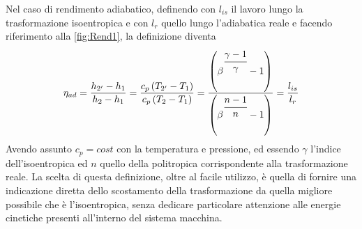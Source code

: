 Nel caso di rendimento adiabatico, definendo con $l_{is}$ il lavoro lungo la trasformazione isoentropica e con $l_r$ quello lungo l'adiabatica reale e facendo riferimento alla \ref{fig:Rend1}, la definizione diventa
\begin{align*}
\eta_{ad} = \frac{h_{2'} - h_1}{h_2 - h_1} = \frac{c_p \left( T_{2'} - T_1 \right)}{c_p \left( T_2 - T_1 \right)} = \frac{\left( \beta^{\cfrac{\gamma -1}{\gamma}} -1 \right)}{\left( \beta^{\cfrac{n -1}{n}} -1 \right)} = \frac{l_{is}}{l_r}
\end{align*}
Avendo assunto $c_p = cost$ con la temperatura e pressione, ed essendo $\gamma$ l'indice dell'isoentropica ed $n$ quello della politropica corrispondente alla trasformazione reale. La scelta di questa definizione, oltre al facile utilizzo, è quella di fornire una indicazione diretta dello scostamento della trasformazione da quella migliore possibile che è l'isoentropica, senza dedicare particolare attenzione alle energie cinetiche presenti all'interno del sistema macchina.
